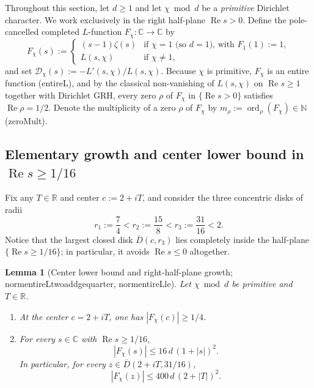 \documentclass[11pt,reqno]{amsart}
\numberwithin{equation}{section}
\newtheorem{lemma}[theorem]{Lemma}
\theoremstyle{definition}
\newcommand{\C}{\mathbb{C}}
\newcommand{\R}{\mathbb{R}}
\newcommand{\N}{\mathbb{N}}
\newcommand{\1}{\mathbf{1}}
\newcommand{\D}{\mathcal{D}}
\renewcommand{\Re}{\operatorname{Re}}
\DeclareMathOperator{\ord}{ord}
\newcommand{\lean}[1]{{\footnotesize\ttfamily\renewcommand{\_}{\textunderscore\allowbreak}#1}}
\newcommand{\GRH}{\textup{GRH}}
\begin{document}
Throughout this section, let $d \ge 1$ and let $\chi \bmod d$ be a \emph{primitive} Dirichlet character. We work exclusively in the right half-plane $\Re s > 0$. Define the pole-cancelled completed $L$-function $F_\chi : \C \to \C$ by
\begin{equation}\label{eq:entireL}
  F_\chi(s) := \begin{cases}
    (s - 1)\zeta(s) & \text{if } \chi = 1 \text{ (so } d = 1\text{), with } F_1(1) := 1,\\
    L(s, \chi) & \text{if } \chi \neq 1,
  \end{cases}
\end{equation}
and set $\D_\chi(s) := -L'(s, \chi)/L(s, \chi)$. Because $\chi$ is primitive, $F_\chi$ is an entire function (\lean{entireL}), and by the classical non-vanishing of $L(s, \chi)$ on $\Re s \ge 1$ together with Dirichlet \GRH{}, every zero $\rho$ of $F_\chi$ in $\{\Re s > 0\}$ satisfies $\Re \rho = 1/2$. Denote the multiplicity of a zero $\rho$ of $F_\chi$ by $m_\rho := \ord_\rho(F_\chi) \in \N$ (\lean{zeroMult}).

\subsection{Elementary growth and center lower bound in \texorpdfstring{$\Re s \ge 1/16$}{Re s >= 1/16}}

Fix any $T \in \R$ and center $c := 2 + iT$, and consider the three concentric disks of radii
\begin{equation}\label{eq:radii}
  r_1 := \frac{7}{4} < r_2 := \frac{15}{8} < r_3 := \frac{31}{16} < 2.
\end{equation}
Notice that the largest closed disk $\overline{D}(c, r_3)$ lies completely inside the half-plane $\{\Re s \ge 1/16\}$; in particular, it avoids $\Re s \le 0$ altogether.

\begin{lemma}[Center lower bound and right-half-plane growth; \lean{norm\_entireL\_two\_add\_ge\_quarter}, \lean{norm\_entireL\_le}]
\label{lem:growth-and-center}
Let $\chi \bmod d$ be primitive and $T \in \R$.
\begin{enumerate}[label=(\alph*)]
  \item At the center $c = 2 + iT$, one has $|F_\chi(c)| \ge 1/4$.
  \item For every $s \in \C$ with $\Re s \ge 1/16$,
  \begin{equation}\label{eq:entireL-poly-bound}
    |F_\chi(s)| \le 16\, d\,(1 + |s|)^2.
  \end{equation}
  In particular, for every $z \in \overline{D}(2+iT, 31/16)$,
  \[
    |F_\chi(z)| \le 400\, d\,(2 + |T|)^2.
  \]
\end{enumerate}
\end{lemma}
\end{document}
